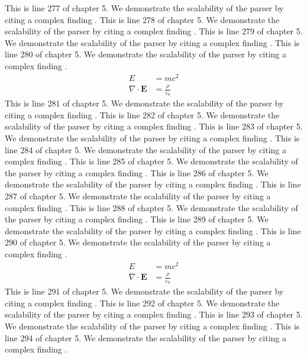 This is line 277 of chapter 5. We demonstrate the scalability of the parser by citing a complex finding \cite{ref5_277}.
This is line 278 of chapter 5. We demonstrate the scalability of the parser by citing a complex finding \cite{ref5_278}.
This is line 279 of chapter 5. We demonstrate the scalability of the parser by citing a complex finding \cite{ref5_279}.
This is line 280 of chapter 5. We demonstrate the scalability of the parser by citing a complex finding \cite{ref5_280}.
\begin{align*}
  E &= mc^2 \\
  \nabla \cdot \mathbf{E} &= \frac{\rho}{\varepsilon_0}
\end{align*}
This is line 281 of chapter 5. We demonstrate the scalability of the parser by citing a complex finding \cite{ref5_281}.
This is line 282 of chapter 5. We demonstrate the scalability of the parser by citing a complex finding \cite{ref5_282}.
This is line 283 of chapter 5. We demonstrate the scalability of the parser by citing a complex finding \cite{ref5_283}.
This is line 284 of chapter 5. We demonstrate the scalability of the parser by citing a complex finding \cite{ref5_284}.
This is line 285 of chapter 5. We demonstrate the scalability of the parser by citing a complex finding \cite{ref5_285}.
This is line 286 of chapter 5. We demonstrate the scalability of the parser by citing a complex finding \cite{ref5_286}.
This is line 287 of chapter 5. We demonstrate the scalability of the parser by citing a complex finding \cite{ref5_287}.
This is line 288 of chapter 5. We demonstrate the scalability of the parser by citing a complex finding \cite{ref5_288}.
This is line 289 of chapter 5. We demonstrate the scalability of the parser by citing a complex finding \cite{ref5_289}.
This is line 290 of chapter 5. We demonstrate the scalability of the parser by citing a complex finding \cite{ref5_290}.
\begin{align*}
  E &= mc^2 \\
  \nabla \cdot \mathbf{E} &= \frac{\rho}{\varepsilon_0}
\end{align*}
This is line 291 of chapter 5. We demonstrate the scalability of the parser by citing a complex finding \cite{ref5_291}.
This is line 292 of chapter 5. We demonstrate the scalability of the parser by citing a complex finding \cite{ref5_292}.
This is line 293 of chapter 5. We demonstrate the scalability of the parser by citing a complex finding \cite{ref5_293}.
This is line 294 of chapter 5. We demonstrate the scalability of the parser by citing a complex finding \cite{ref5_294}.
